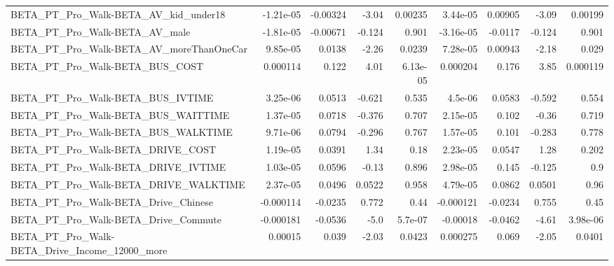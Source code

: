 \begin{tabular}{lrrrrrrrr}
BETA\_PT\_Pro\_Walk-BETA\_AV\_kid\_under18               &   -1.21e-05 &     -0.00324 &     -3.04 &  0.00235 &   3.44e-05 &     0.00905 &        -3.09 &       0.00199 \\
BETA\_PT\_Pro\_Walk-BETA\_AV\_male                      &   -1.81e-05 &     -0.00671 &    -0.124 &    0.901 &  -3.16e-05 &     -0.0117 &       -0.124 &         0.901 \\
BETA\_PT\_Pro\_Walk-BETA\_AV\_moreThanOneCar            &    9.85e-05 &       0.0138 &     -2.26 &   0.0239 &   7.28e-05 &     0.00943 &        -2.18 &         0.029 \\
BETA\_PT\_Pro\_Walk-BETA\_BUS\_COST                     &    0.000114 &        0.122 &      4.01 & 6.13e-05 &   0.000204 &       0.176 &         3.85 &      0.000119 \\
BETA\_PT\_Pro\_Walk-BETA\_BUS\_IVTIME                   &    3.25e-06 &       0.0513 &    -0.621 &    0.535 &    4.5e-06 &      0.0583 &       -0.592 &         0.554 \\
BETA\_PT\_Pro\_Walk-BETA\_BUS\_WAITTIME                 &    1.37e-05 &       0.0718 &    -0.376 &    0.707 &   2.15e-05 &       0.102 &        -0.36 &         0.719 \\
BETA\_PT\_Pro\_Walk-BETA\_BUS\_WALKTIME                 &    9.71e-06 &       0.0794 &    -0.296 &    0.767 &   1.57e-05 &       0.101 &       -0.283 &         0.778 \\
BETA\_PT\_Pro\_Walk-BETA\_DRIVE\_COST                   &    1.19e-05 &       0.0391 &      1.34 &     0.18 &   2.23e-05 &      0.0547 &         1.28 &         0.202 \\
BETA\_PT\_Pro\_Walk-BETA\_DRIVE\_IVTIME                 &    1.03e-05 &       0.0596 &     -0.13 &    0.896 &   2.98e-05 &       0.145 &       -0.125 &           0.9 \\
BETA\_PT\_Pro\_Walk-BETA\_DRIVE\_WALKTIME               &    2.37e-05 &       0.0496 &    0.0522 &    0.958 &   4.79e-05 &      0.0862 &       0.0501 &          0.96 \\
BETA\_PT\_Pro\_Walk-BETA\_Drive\_Chinese                &   -0.000114 &      -0.0235 &     0.772 &     0.44 &  -0.000121 &     -0.0234 &        0.755 &          0.45 \\
BETA\_PT\_Pro\_Walk-BETA\_Drive\_Commute                &   -0.000181 &      -0.0536 &      -5.0 &  5.7e-07 &   -0.00018 &     -0.0462 &        -4.61 &      3.98e-06 \\
BETA\_PT\_Pro\_Walk-BETA\_Drive\_Income\_12000\_more      &     0.00015 &        0.039 &     -2.03 &   0.0423 &   0.000275 &       0.069 &        -2.05 &        0.0401 \\

\end{tabular}
